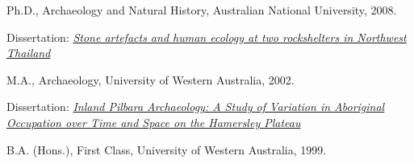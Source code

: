 
\ind Ph.D., Archaeology and Natural History, Australian National University, 2008.

 \vspace{0.05in}
\begin{Spacing}{0.75}
\ind \hspace{0.35in} 
\footnotesize {Dissertation: \emph{\href{http://dx.doi.org/10.6084/m9.figshare.765252}{Stone artefacts and human ecology at two rockshelters in Northwest Thailand}}} \normalsize \vspace{0.05in}
 \end{Spacing}

\ind M.A., Archaeology, University of Western Australia, 2002. 

\vspace{0.05in}
\begin{Spacing}{0.75} 
\ind \hspace{0.35in} \footnotesize Dissertation: \emph{\href{http://dx.doi.org/10.6084/m9.figshare.765251}{ Inland Pilbara Archaeology: A Study of Variation in Aboriginal Occupation over Time and Space on the Hamersley Plateau}} \normalsize \vspace{0.05in}
 \end{Spacing}

\ind B.A. (Hons.), First Class, University of Western Australia, 1999.